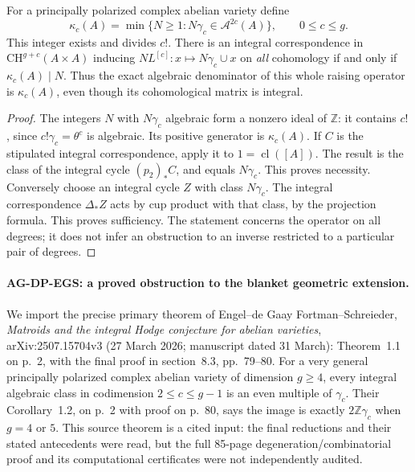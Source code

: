 \begin{proposition}
For a principally polarized complex abelian variety define
\[
 \kappa_c(A)=\min\{N\ge1:N\gamma_c\in\mathcal A^{2c}(A)\},
 \qquad 0\le c\le g.
\]
This integer exists and divides $c!$.
There is an integral correspondence in
$\mathrm{CH}^{g+c}(A\times A)$ inducing
$N L^{[c]}:x\mapsto N\gamma_c\cup x$ on \emph{all}
cohomology if and only if $\kappa_c(A)\mid N$.
Thus the exact algebraic denominator of this whole
raising operator is $\kappa_c(A)$, even though its
cohomological matrix is integral.
\end{proposition}
\begin{proof}
The integers $N$ with $N\gamma_c$ algebraic form a nonzero
ideal of $\mathbb Z$: it contains $c!$, since
$c!\gamma_c=\theta^c$ is algebraic.  Its positive generator
is $\kappa_c(A)$.  If $C$ is the stipulated integral
correspondence, apply it to $1=\operatorname{cl}([A])$.
The result is the class of the integral cycle $(p_2)_*C$,
and equals $N\gamma_c$.  This proves necessity.
Conversely choose an integral cycle $Z$ with class
$N\gamma_c$.  The integral correspondence $\Delta_*Z$
acts by cup product with that class, by the projection
formula.  This proves sufficiency.  The statement concerns
the operator on all degrees; it does not infer an obstruction
to an inverse restricted to a particular pair of degrees.
\end{proof}

\paragraph{AG-DP-EGS: a proved obstruction to the blanket geometric extension.}
We import the precise primary theorem of Engel--de Gaay
Fortman--Schreieder, \emph{Matroids and the integral Hodge
conjecture for abelian varieties}, arXiv:2507.15704v3
(27 March 2026; manuscript dated 31 March): Theorem~1.1
on p.~2, with the final proof in section~8.3, pp.~79--80.
For a very general principally polarized complex abelian
variety of dimension $g\ge4$, every integral algebraic
class in codimension $2\le c\le g-1$ is an even multiple
of $\gamma_c$.  Their Corollary~1.2, on p.~2 with proof
on p.~80, says the image is exactly $2\mathbb Z\gamma_c$
when $g=4$ or $5$.  This source theorem is a cited input:
the final reductions and their stated antecedents were read,
but the full 85-page degeneration/combinatorial proof and
its computational certificates were not independently audited.

